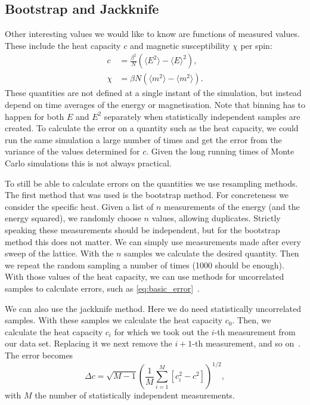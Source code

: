 \documentclass[11pt, a4paper]{report} %
\begin{document}
\subsection{Bootstrap and Jackknife}
Other interesting values we would like to know are functions of measured values.
These include the heat capacity \(c\) and magnetic susceptibility \(\chi\) per spin:
\begin{align}
	c &= \frac{\beta^2}{N} \left(\langle E^2 \rangle - \langle E \rangle^2 \right), \\
	\chi &= \beta N \left( \langle m^2 \rangle - \langle m^2 \rangle \right).
\end{align}
These quantities are not defined at a single instant of the simulation, but instead depend on time averages of the energy or magnetisation.
Note that binning has to happen for both \(E\) and \(E^2\) separately when statistically independent samples are created.
To calculate the error on a quantity such as the heat capacity, we could run the same simulation a large number of times and get the error from the variance of the values determined for \(c\).
Given the long running times of Monte Carlo simulations this is not always practical.

To still be able to calculate errors on the quantities we use resampling methods.
The first method that was used is the bootstrap method.
For concreteness we consider the specific heat.
Given a list of \(n\) measurements of the energy (and the energy squared), we randomly choose \(n\) values, allowing duplicates.
Strictly speaking these measurements should be independent, but for the bootstrap method this does not matter.
We can simply use measurements made after every sweep of the lattice.
With the \(n\) samples we calculate the desired quantity.
Then we repeat the random sampling a number of times (1000 should be enough).
With those values of the heat capacity, we can use methods for uncorrelated samples to calculate errors, such as \cref{eq:basic_error}~\cite{newman:1999}.

We can also use the jackknife method.
Here we do need statistically uncorrelated samples.
With these samples we calculate the heat capacity \(c_0\).
Then, we calculate the heat capacity \(c_i\) for which we took out the \(i\)-th measurement from our data set.
Replacing it we next remove the \(i+1\)-th measurement, and so on~\cite{newman:1999}.
The error becomes~\cite{corboz}
\begin{equation}
	\Delta c = \sqrt{M-1}\left( \frac{1}{M} \sum_{i=1}^M \left[c_i^2 - c^2\right] \right)^{1/2},
\end{equation}
with \(M\) the number of statistically independent measurements.
\end{document}
